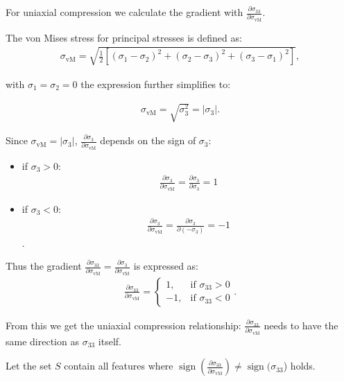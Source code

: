 For uniaxial compression we calculate the gradient with $\frac{\partial \sigma_{33}}{\partial \sigma_{\text{vM}}}$.

The von Mises stress for principal stresses is defined as:
\begin{align*}
    \sigma_\text{vM}=
    \sqrt{
    \frac{1}{2}
    [
    (\sigma_1 - \sigma_2)^2 + 
    (\sigma_2 - \sigma_3)^2 + 
    (\sigma_3 - \sigma_1)^2
    ]
    },   
\end{align*}

with $\sigma_{1} = \sigma_{2} = 0$ the expression further simplifies to:

\begin{align*}
    \sigma_\text{vM}=
    \sqrt{ \sigma_3^2
    }
    =
    |\sigma_3|.
\end{align*}

Since $\sigma_\text{vM}=|\sigma_3|$, $\frac{\partial \sigma_{3}}{\partial \sigma_{\text{vM}}}$ depends on the sign of $\sigma_3$:

\begin{itemize}
    \item if $ \sigma_3 > 0$:
    \begin{align*}
    \frac{\partial \sigma_{3}}{\partial \sigma_{\text{vM}}} =
    \frac{\partial \sigma_{3}}{\partial \sigma_3} = 1
    \end{align*}
    \item if $\sigma_3 < 0$:
    \begin{align*}
    \frac{\partial \sigma_{3}}{\partial \sigma_{\text{vM}}} =
    \frac{\partial \sigma_{3}}{\partial (-\sigma_3)} = -1
    \end{align*}.
\end{itemize}

Thus the gradient 
$\frac{\partial \sigma_{33}}{\partial \sigma_{\text{vM}}} = \frac{\partial \sigma_{3}}{\partial \sigma_{\text{vM}}}$ is expressed as:
\begin{align*}
\frac{\partial \sigma_{33}}{\partial \sigma_{\text{vM}}} =
\begin{cases}
1, & \text{if } \sigma_{33} > 0 \\
-1, & \text{if } \sigma_{33} < 0
\end{cases}
.
\end{align*}

From this we get the uniaxial compression relationship: $\frac{\partial \sigma_{33}}{\partial \sigma_{\text{vM}}}$ needs to have the same direction as $\sigma_{33}$ itself.

Let the set $S$ contain all features where $\operatorname{sign}(\frac{\partial \sigma_{33}}{\partial \sigma_{\text{vM}}}) \neq \operatorname{sign}(\sigma_{33}$) holds.

